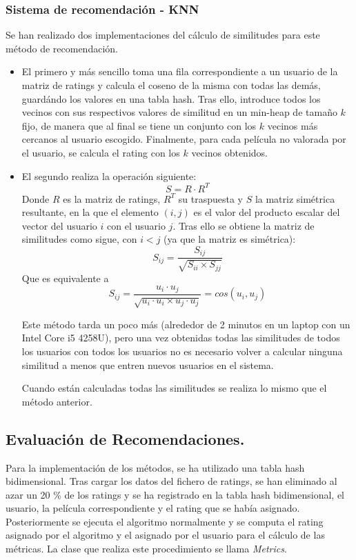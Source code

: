 \documentclass[spanish]{assignment}
\begin{document}
	\subsubsection{Sistema de recomendación - KNN}
	Se han realizado dos implementaciones del cálculo de similitudes para este método de recomendación.
	\begin{itemize}
		\item El primero y más sencillo toma una fila correspondiente a un usuario de la matriz de ratings y calcula el coseno de la misma con todas las demás, guardándo los valores en una tabla hash. Tras ello, introduce todos los vecinos con sus respectivos valores de similitud en un min-heap de tamaño $k$ fijo, de manera que al final se tiene un conjunto con los $k$ vecinos más cercanos al usuario escogido. Finalmente, para cada película no valorada por el usuario, se calcula el rating con los $k$ vecinos obtenidos.
		
		\item El segundo realiza la operación siguiente:
		$$S = R\cdot R^T$$
		Donde $R$ es la matriz de ratings, $R^T$ su traspuesta y $S$ la matriz simétrica resultante, en la que el elemento $(i,j)$ es el valor del producto escalar del vector del usuario $i$ con el usuario $j$.
		Tras ello se obtiene la matriz de similitudes como sigue, con $i<j$ (ya que la matriz es simétrica):
		$$S_{ij} = \frac{S_{ij}}{\sqrt{S_{ii}\times S_{jj}}}$$
		Que es equivalente a
		$$S_{ij} = \frac{u_i\cdot u_j}{\sqrt{u_i\cdot u_i \times u_j \cdot u_j}} = cos(u_i, u_j)$$
		
		Este método tarda un poco más (alrededor de 2 minutos en un laptop con un Intel Core i5 4258U), pero una vez obtenidas todas las similitudes de todos los usuarios con todos los usuarios no es necesario volver a calcular ninguna similitud a menos que entren nuevos usuarios en el sistema.
		
		Cuando están calculadas todas las similitudes se realiza lo mismo que el método anterior.
	\end{itemize}
	
	\subsection{Evaluación de Recomendaciones.}
	Para la implementación de los métodos, se ha utilizado una tabla hash bidimensional. Tras cargar los datos del fichero de ratings, se han eliminado al azar
	un 20 \% de los ratings y se ha registrado en la tabla hash bidimensional, el usuario, la película correspondiente y el rating que se había asignado.
	Posteriormente se ejecuta el algoritmo normalmente y se computa el rating asignado por el algoritmo y el asignado por el usuario para el cálculo de las métricas.
	La clase que realiza este procedimiento se llama \textit{Metrics}.
	
\end{document}
